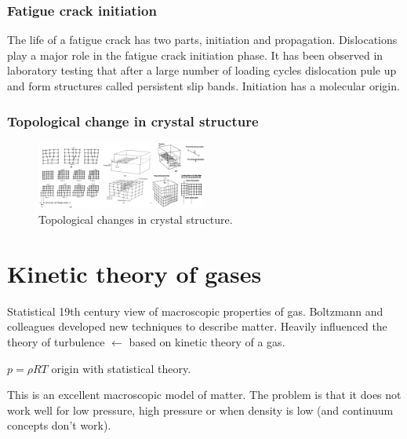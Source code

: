 \subsubsection{Fatigue crack initiation}
The life of a fatigue crack has two parts, initiation and propagation. Dislocations play a major role in the fatigue crack initiation phase. It has been observed in laboratory testing that after a large number of loading cycles dislocation pule up and form structures called persistent slip bands. Initiation has a molecular origin.
\subsubsection{Topological change in crystal structure}
\begin{figure}[H]
	\centering
	\includegraphics[width = 0.5\textwidth]{./img/figure16.png}
	\caption{Topological changes in crystal structure.}
\end{figure}
\section{Kinetic theory of gases}
Statistical 19th century view of macroscopic properties of gas. Boltzmann and colleagues developed new techniques to describe matter. Heavily influenced the theory of turbulence $\leftarrow$ based on kinetic theory of a gas.

$p = \rho RT$ origin with statistical theory.

This is an excellent macroscopic model of matter. The problem is that it does not work well for low pressure, high pressure or when density is low (and continuum concepts don't work).
